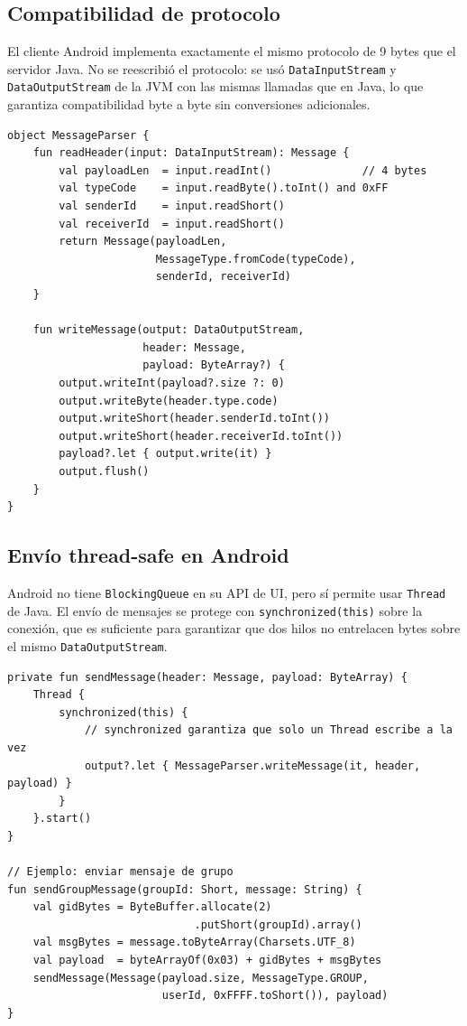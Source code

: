 \documentclass[12pt,a4paper]{article}
\begin{document}
\subsection{Compatibilidad de protocolo}

El cliente Android implementa exactamente el mismo protocolo de 9 bytes que
el servidor Java. No se reescribió el protocolo: se usó \texttt{DataInputStream}
y \texttt{DataOutputStream} de la JVM con las mismas llamadas que en Java, lo
que garantiza compatibilidad byte a byte sin conversiones adicionales.

\begin{lstlisting}[style=kotlin, caption={MessageParser.kt --- mismo protocolo en Kotlin}]
object MessageParser {
    fun readHeader(input: DataInputStream): Message {
        val payloadLen  = input.readInt()              // 4 bytes
        val typeCode    = input.readByte().toInt() and 0xFF
        val senderId    = input.readShort()
        val receiverId  = input.readShort()
        return Message(payloadLen,
                       MessageType.fromCode(typeCode),
                       senderId, receiverId)
    }

    fun writeMessage(output: DataOutputStream,
                     header: Message,
                     payload: ByteArray?) {
        output.writeInt(payload?.size ?: 0)
        output.writeByte(header.type.code)
        output.writeShort(header.senderId.toInt())
        output.writeShort(header.receiverId.toInt())
        payload?.let { output.write(it) }
        output.flush()
    }
}
\end{lstlisting}

\subsection{Envío thread-safe en Android}

Android no tiene \texttt{BlockingQueue} en su API de UI, pero sí permite
usar \texttt{Thread} de Java. El envío de mensajes se protege con
\texttt{synchronized(this)} sobre la conexión, que es suficiente para
garantizar que dos hilos no entrelacen bytes sobre el mismo
\texttt{DataOutputStream}.

\begin{lstlisting}[style=kotlin, caption={Connection.kt --- synchronized para escritura al socket}]
private fun sendMessage(header: Message, payload: ByteArray) {
    Thread {
        synchronized(this) {
            // synchronized garantiza que solo un Thread escribe a la vez
            output?.let { MessageParser.writeMessage(it, header, payload) }
        }
    }.start()
}

// Ejemplo: enviar mensaje de grupo
fun sendGroupMessage(groupId: Short, message: String) {
    val gidBytes = ByteBuffer.allocate(2)
                             .putShort(groupId).array()
    val msgBytes = message.toByteArray(Charsets.UTF_8)
    val payload  = byteArrayOf(0x03) + gidBytes + msgBytes
    sendMessage(Message(payload.size, MessageType.GROUP,
                        userId, 0xFFFF.toShort()), payload)
}
\end{lstlisting}
\end{document}
